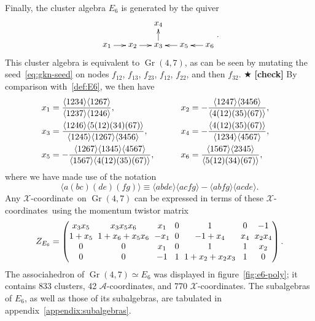 \documentclass[12pt]{article}
\DeclareMathOperator{\Gr}{Gr}
\def\ket#1{\langle #1 \rangle}
\def\xcoord{$\mathcal{X}$-coordinate}
\def\xcoords{$\mathcal{X}$-coordinates}
\def\acoords{$\mathcal{A}$-coordinates}
\def\draftnote#1{{\color{red} $\bigstar$ }{\bf [#1]}}
\begin{document}
Finally, the cluster algebra $E_6$ is generated by the quiver
\begin{equation}\label{def:E6}
    \begin{gathered}
    \begin{xy} 0;<1pt,0pt>:<0pt,-1pt>::
      (0,0) *+{x_1} ="1",
      (30,0) *+{x_2} ="2",
      (60,0) *+{x_3} ="3",
      (60,-25) *+{x_4} ="4",
      (90,0) *+{x_5} ="5",
      (120,0) *+{x_6} ="6",
      "1", {\ar"2"},
      "2", {\ar"3"},
      "3", {\ar"4"},
      "5", {\ar"3"},
      "6", {\ar"5"},
    \end{xy}
    \end{gathered} .
\end{equation}
This cluster algebra is equivalent to $\Gr(4,7)$, as can be seen by mutating the seed~\eqref{eq:gkn-seed} on nodes $f_{12}$, $f_{13}$, $f_{23}$, $f_{12}$, $f_{22}$, and then $f_{32}$.\draftnote{check} By comparison with~\eqref{def:E6}, we then have 
\begin{align} \label{eq:E6_x_def}
x_1 &= \frac{\ket{1234}\ket{1267}}{\ket{1237} \ket{1246}}, \hspace{13.03ex} \quad \quad 
x_2 = - \frac{\ket{1247} \ket{3456}}{\ket{4(12)(35)(67)}}, \quad \nonumber \\
x_3 &= \frac{\ket{1246} \ket{5(12)(34)(67)}}{\ket{1245} \ket{1267} \ket{3456}}, \hspace{4.12ex} \quad \quad 
x_4 = -\frac{\ket{4(12)(35)(67)}}{\ket{1234} \ket{4567}}, \quad \\
x_5 &= -\frac{\ket{1267} \ket{1345}\ket{4567}}{\ket{1567}\ket{4(12)(35)(67)}}, \quad \quad \quad 
x_6 = \frac{\ket{1567}\ket{2345}}{\ket{5(12)(34)(67)}}, \quad \nonumber
\end{align}
where we have made use of the notation
\begin{equation} \label{eq:twistor_intersection}
\ket{a(bc)(de)(fg)} \equiv \ket{abde}\ket{acfg}-\ket{abfg}\ket{acde}.
\end{equation}
Any \xcoord\ on $\Gr(4,7)$ can be expressed in terms of these \xcoords\ using the momentum twistor matrix 
\begin{equation}
Z_{E_6} = 
\begingroup
\setlength\arraycolsep{3pt}
\begin{pmatrix} 
 x_3 x_5 & x_3 x_5 x_6 & x_1 & 0 & 1 & 0 & -1 \\
 1+x_5 & 1 + x_6 + x_5 x_6 & -x_1 & 0 & -1+x_4 & x_4 & x_2 x_4 \\
 0 & 0 & x_1 & 0 & 1 & 1 & x_2 \\
 0 & 0 & -1 & 1 & 1+x_2+x_2 x_3 & 1 & 0 \\
\end{pmatrix} .
\endgroup
\end{equation}
The associahedron of $\Gr(4,7) \simeq E_6$ was displayed in figure~\ref{fig:e6-poly}; it contains 833 clusters, 42 \acoords, and 770 \xcoords. The subalgebras of $E_6$, as well as those of its subalgebras, are tabulated in appendix~\ref{appendix:subalgebras}.
\end{document}
